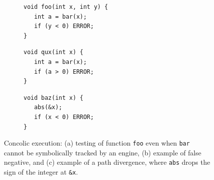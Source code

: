\begin{figure}[t]
  \begin{subfigure}[t]{.33\textwidth}
    \begin{lstlisting}[basicstyle=\ttfamily\scriptsize]
void foo(int x, int y) {
   int a = bar(x);
   if (y < 0) ERROR;
} 
\end{lstlisting}
    \vspace{-4mm}
    \caption{}
  \end{subfigure}%
  \begin{subfigure}[t]{.33\textwidth}
    \begin{lstlisting}[basicstyle=\ttfamily\scriptsize]
void qux(int x) {
   int a = bar(x);
   if (a > 0) ERROR;
} 
\end{lstlisting}
    \vspace{-4mm}
    \caption{}
  \end{subfigure}%
  \begin{subfigure}[t]{.33\textwidth}
    \begin{lstlisting}[basicstyle=\ttfamily\scriptsize]
void baz(int x) {
   abs(&x);
   if (x < 0) ERROR;
}   
\end{lstlisting}
    \vspace{-4mm}
    \caption{}
  \end{subfigure}%

  \vspace{-2mm}
  \caption{Concolic execution: (a) testing of function {\tt foo} even when {\tt bar} cannot be symbolically tracked by an engine, (b) example of false negative, and (c) example of a path divergence, where \texttt{abs} drops the sign of the integer at \texttt{\&x}.
   }
  \label{fig:example-concolic-problems}
  \vspace{-3mm}
\end{figure}

